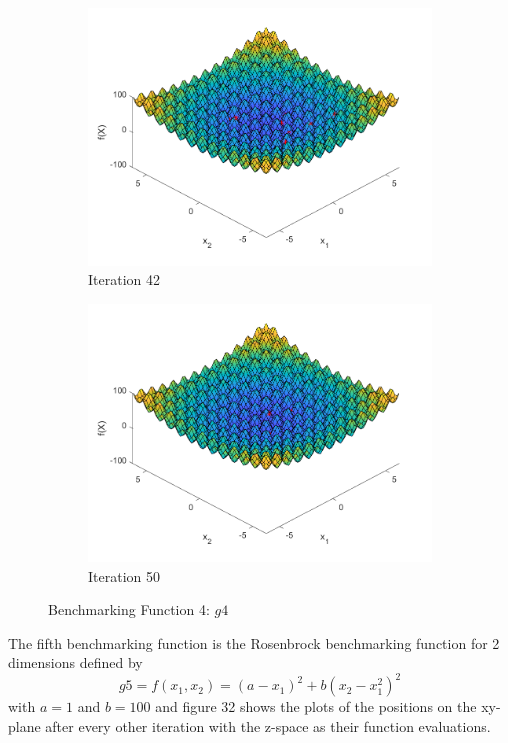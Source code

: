 \begin{figure}
\begin{subfigure}[b]{0.4\textwidth}
    \includegraphics[width=\textwidth]{img/smpl/rast2d/loa-iter-42}
    \caption{Iteration 42}
    \label{fig:s4-iter-6}
  \end{subfigure}
  \begin{subfigure}[b]{0.4\textwidth}
    \includegraphics[width=\textwidth]{img/smpl/rast2d/loa-iter-50}
    \caption{Iteration 50}
    \label{fig:s4-iter-7}
  \end{subfigure}
  \caption{Benchmarking Function 4: $g4$}
\end{figure}


\par The fifth benchmarking function is the Rosenbrock benchmarking function for 2 dimensions defined by
$$
  g5=f(x_1, x_2) = (a-x_1)^2+b(x_2-x_1^2)^2
$$
with $a = 1$ and $b=100$ and figure 32 shows the plots of the positions on the xy-plane after every other iteration with the z-space as their function evaluations.

